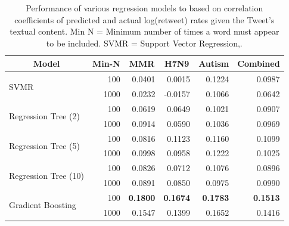 \begin{table}[]
\centering
\begin{tabular}{|l|r|r|r|r|r|}
\hline
\multicolumn{1}{|c|}{Model}           & \multicolumn{1}{c|}{Min-N} & \multicolumn{1}{c|}{MMR} & \multicolumn{1}{c|}{H7N9} & \multicolumn{1}{c|}{Autism} & \multicolumn{1}{c|}{Combined} \\ \hline
\multirow{2}{*}{SVMR}                 & 100                        & 0.0401                   & 0.0015                    & 0.1224                      & 0.0987                        \\ \cline{2-6} 
                                      & 1000                       & 0.0232                   & -0.0157                   & 0.1066                      &     0.0642                          \\ \hline
\multirow{2}{*}{Regression Tree (2)}  & 100                        & 0.0619                   & 0.0649                    & 0.1021                      & 0.0907                        \\ \cline{2-6} 
                                      & 1000                       & 0.0914                   & 0.0590                    & 0.1036                      & 0.0969                        \\ \hline
\multirow{2}{*}{Regression Tree (5)}  & 100                        & 0.0816                   & 0.1123                    & 0.1160                      & 0.1099                        \\ \cline{2-6} 
                                      & 1000                       & 0.0998                   & 0.0958                    &                            0.1222 & 0.1025                        \\ \hline
\multirow{2}{*}{Regression Tree (10)} & 100                        & 0.0826                   & 0.0712                    & 0.1076                      & 0.0896                        \\ \cline{2-6} 
                                      & 1000                       & 0.0891                   & 0.0850                    & 0.0975                      & 0.0990                        \\ \hline
\multirow{2}{*}{Gradient Boosting}    & 100                        & \textbf{0.1800}                   & \textbf{0.1674}                    & \textbf{0.1783}                      & \textbf{0.1513}                        \\ \cline{2-6} 
                                      & 1000                       & 0.1547                   & 0.1399                    & 0.1652                      & 0.1416                        \\ \hline
\end{tabular}
\caption{Performance of various regression models to based on correlation coefficients of predicted and actual log(retweet) rates given the Tweet's textual content. Min N = Minimum number of times a word must appear to be included. SVMR = Support Vector Regression,.}
\label{tab:keywordregression}
\end{table}

